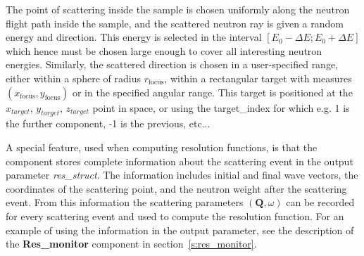 The point of scattering inside the sample is chosen uniformly
along the neutron flight path inside the sample, and the scattered
neutron ray is given a random energy and direction. This energy is selected in
the interval $[E_0-\Delta E; E_0+\Delta E]$ which hence must be
chosen large enough to cover all interesting neutron energies.
Similarly, the scattered
direction is chosen in a user-specified range,
either within a sphere of radius $r_\textrm{focus}$, within a rectangular
target with measures $(x_\textrm{focus}, y_\textrm{focus})$
or in the specified angular range. This target is positioned at the $x_{target}$, $y_{target}$, $z_{target}$ point in space, or using the target\_index for which e.g. 1 is the further component, -1 is the previous, etc...

A special feature, used when computing resolution functions, is that the
component stores complete information about the scattering event in the
output parameter \textit{res\_struct}. The information includes initial
and final wave vectors, the coordinates of the scattering point, and the
neutron weight after the scattering event. From this information the
scattering parameters $(\textbf{Q}, \omega)$ can be recorded
for every scattering event and used to compute the resolution function.
For an example of using the
information in the output parameter, see the description of the
\textbf{Res\_monitor} component in section~\ref{s:res_monitor}.

